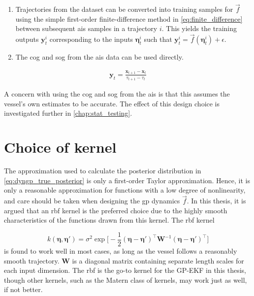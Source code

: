 \begin{enumerate}
    \item Trajectories from the dataset can be converted into training samples for $\vec{f}$ using the simple first-order finite-difference method in \cref{eq:finite_difference} between subsequent \acrshort{ais} samples in a trajectory $i$. This yields the training outputs $\boldsymbol{y}_t^{i}$ corresponding to the inputs $\boldsymbol{\eta}_t^i$ such that $\boldsymbol{y}_t^i = \vec{f}(\boldsymbol{\eta}_t^i) + \epsilon$.
    \item The \acrshort{cog} and \acrshort{sog} from the \acrshort{ais} data can be used directly.
\end{enumerate}

\begin{align}\label{eq:finite_difference}
    \boldsymbol{y}_t = \frac{\boldsymbol{x}_{t+1} - \boldsymbol{x}_t}{\tau_{t+1} - \tau_t}
\end{align}

A concern with using the \acrshort{cog} and \acrshort{sog} from the \acrshort{ais} is that this assumes the vessel's own estimates to be accurate. The effect of this design choice is investigated further in \cref{chap:stat_testing}.


\section{Choice of kernel}
The approximation used to calculate the posterior distribution in \cref{eq:dyngp_true_posterior} is only a first-order Taylor approximation. Hence, it is only a reasonable approximation for functions with a low degree of nonlinearity, and care should be taken when designing the \acrshort{gp} dynamics $\vec{f}$. In this thesis, it is argued that an \acrshort{rbf} kernel is the preferred choice due to the highly smooth characteristics of the functions drawn from this kernel. The \acrshort{rbf} kernel

\begin{equation}\label{eq:dyngp_kernel}
    k(\boldsymbol{\eta}, \boldsymbol{\eta}') = \sigma^2 \exp \big[ - \frac{1}{2} (\boldsymbol{\eta} - \boldsymbol{\eta}')^\intercal \boldsymbol{W}^{-1} (\boldsymbol{\eta} - \boldsymbol{\eta}')^\intercal\big]
\end{equation}
is found to work well in most cases, as long as the vessel follows a reasonably smooth trajectory. $\boldsymbol{W}$ is a diagonal matrix containing separate length scales for each input dimension. The \acrshort{rbf} is the go-to kernel for the GP-EKF in this thesis, though other kernels, such as the Matern class of kernels, may work just as well, if not better.

